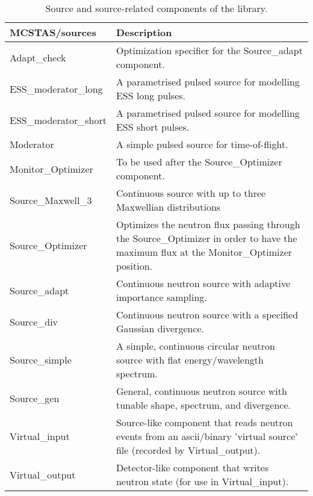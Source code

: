 \begin{table}
  \begin{center}
    {\let\my=\\
    \begin{tabular}{|p{}|p{}|}
      \hline
       {\bf MCSTAS/sources} & Description \\
       \hline
Adapt\_check & Optimization specifier for the Source\_adapt component. \\
ESS\_moderator\_long & A parametrised pulsed source for modelling ESS long pulses. \\
ESS\_moderator\_short & A parametrised pulsed source for modelling ESS short pulses. \\
Moderator  & A simple pulsed source for time-of-flight. \\
Monitor\_Optimizer &  To be used after the Source\_Optimizer component. \\
Source\_Maxwell\_3 & Continuous source with up to three Maxwellian distributions \\
Source\_Optimizer & Optimizes the neutron flux passing through the Source\_Optimizer in order to have the maximum flux at the Monitor\_Optimizer position. \\
Source\_adapt  &       Continuous neutron source with adaptive importance sampling. \\
Source\_div &          Continuous neutron source with a specified Gaussian divergence. \\
Source\_simple &  A simple, continuous circular neutron source with flat energy/wavelength spectrum.\\
Source\_gen     &    General, continuous neutron source with tunable shape, spectrum,
                     and divergence. \\
Virtual\_input &  Source-like component that reads neutron events
                  from an ascii/binary 'virtual source' file (recorded by Virtual\_output). \\
Virtual\_output &  Detector-like component that writes neutron state
                   (for use in Virtual\_input). \\
      \hline
    \end{tabular}
    \caption{Source and source-related components of the \MCS library.}
    \label{t:comp-sources}
    }
  \end{center}
\end{table}


